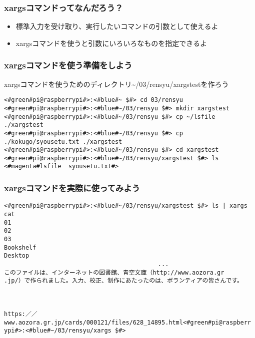 \begin{frame}
    \frametitle{xargsコマンドってなんだろう？}
    \begin{itemize}
        \item 標準入力を受け取り、実行したいコマンドの引数として使えるよ
        \item xargsコマンドを使うと引数にいろいろなものを指定できるよ
    \end{itemize}
    \begin{figure}
        \centering
        
    \end{figure}
\end{frame}

\begin{frame}[fragile]
    \frametitle{xargsコマンドを使う準備をしよう}
    xargsコマンドを使うためのディレクトリ\textasciitilde/03/rensyu/xargstestを作ろう
    \begin{lstlisting}
<#green#pi@raspberrypi#>:<#blue#~ $#> cd 03/rensyu
<#green#pi@raspberrypi#>:<#blue#~/03/rensyu $#> mkdir xargstest
<#green#pi@raspberrypi#>:<#blue#~/03/rensyu $#> cp ~/lsfile ./xargstest
<#green#pi@raspberrypi#>:<#blue#~/03/rensyu $#> cp ./kokugo/syousetu.txt ./xargstest
<#green#pi@raspberrypi#>:<#blue#~/03/rensyu $#> cd xargstest
<#green#pi@raspberrypi#>:<#blue#~/03/rensyu/xargstest $#> ls
<#magenta#lsfile  syousetu.txt#>
    \end{lstlisting}
\end{frame}

\begin{frame}[fragile]
    \frametitle{xargsコマンドを実際に使ってみよう}
    \begin{lstlisting}[title=xargsコマンドを使ってcatコマンドを使う]
<#green#pi@raspberrypi#>:<#blue#~/03/rensyu/xargstest $#> ls | xargs cat
01
02
03
Bookshelf
Desktop
                                           ...
このファイルは、インターネットの図書館、青空文庫（http://www.aozora.gr
.jp/）で作られました。入力、校正、制作にあたったのは、ボランティアの皆さんです。


                
https:／／www.aozora.gr.jp/cards/000121/files/628_14895.html<#green#pi@raspberr
ypi#>:<#blue#~/03/rensyu/xargs $#>
\end{lstlisting}
\end{frame}

